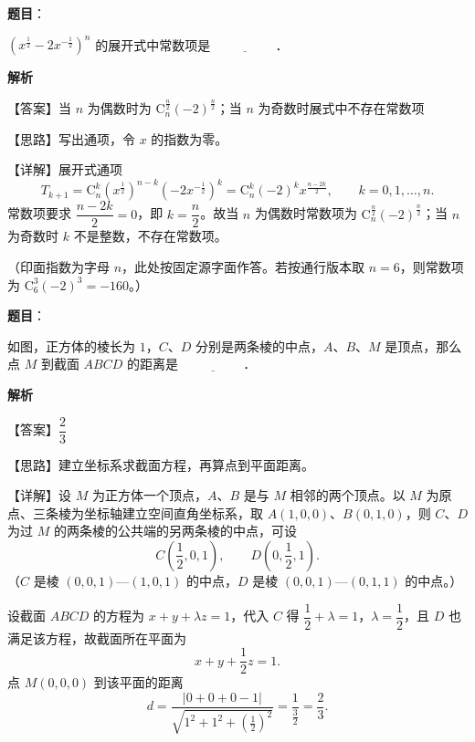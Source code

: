 \begin{answer}

\textbf{题目}：

$\left(x^{\frac{1}{2}} - 2x^{-\frac{1}{2}}\right)^{n}$ 的展开式中常数项是 $\underline{\hspace{2cm}}$．

\textbf{解析}

【答案】当 $n$ 为偶数时为 $\mathrm{C}_{n}^{\frac{n}{2}}(-2)^{\frac{n}{2}}$；当 $n$ 为奇数时展式中不存在常数项

【思路】写出通项，令 $x$ 的指数为零。

【详解】展开式通项
\nopagebreak[4]
\[
T_{k+1} = \mathrm{C}_{n}^{k}\left(x^{\frac{1}{2}}\right)^{n-k}\left(-2x^{-\frac{1}{2}}\right)^{k} = \mathrm{C}_{n}^{k}(-2)^{k}x^{\frac{n-2k}{2}},\qquad k = 0,1,\dots,n.
\]
常数项要求 $\dfrac{n-2k}{2} = 0$，即 $k = \dfrac{n}{2}$。故当 $n$ 为偶数时常数项为 $\mathrm{C}_{n}^{\frac{n}{2}}(-2)^{\frac{n}{2}}$；当 $n$ 为奇数时 $k$ 不是整数，不存在常数项。

（印面指数为字母 $n$，此处按固定源字面作答。若按通行版本取 $n = 6$，则常数项为 $\mathrm{C}_{6}^{3}(-2)^{3} = -160$。）


\end{answer}
\begin{answer}

\textbf{题目}：

如图，正方体的棱长为 $1$，$C$、$D$ 分别是两条棱的中点，$A$、$B$、$M$ 是顶点，那么点 $M$ 到截面 $ABCD$ 的距离是 $\underline{\hspace{2cm}}$．
\nopagebreak[4]
\begin{center}\end{center}
\nopagebreak[4]
\textbf{解析}

【答案】$\dfrac{2}{3}$

【思路】建立坐标系求截面方程，再算点到平面距离。

【详解】设 $M$ 为正方体一个顶点，$A$、$B$ 是与 $M$ 相邻的两个顶点。以 $M$ 为原点、三条棱为坐标轴建立空间直角坐标系，取 $A(1,0,0)$、$B(0,1,0)$，则 $C$、$D$ 为过 $M$ 的两条棱的公共端的另两条棱的中点，可设
\nopagebreak[4]
\[
C\left(\frac{1}{2}, 0, 1\right),\qquad D\left(0, \frac{1}{2}, 1\right).
\]
（$C$ 是棱 $(0,0,1)$—$(1,0,1)$ 的中点，$D$ 是棱 $(0,0,1)$—$(0,1,1)$ 的中点。）

设截面 $ABCD$ 的方程为 $x + y + \lambda z = 1$，代入 $C$ 得 $\dfrac{1}{2} + \lambda = 1$，$\lambda = \dfrac{1}{2}$，且 $D$ 也满足该方程，故截面所在平面为
\nopagebreak[4]
\[
x + y + \frac{1}{2}z = 1.
\]
点 $M(0,0,0)$ 到该平面的距离
\nopagebreak[4]
\[
d = \frac{|0+0+0-1|}{\sqrt{1^2+1^2+\left(\frac{1}{2}\right)^2}} = \frac{1}{\frac{3}{2}} = \frac{2}{3}.
\]


\end{answer}
